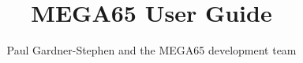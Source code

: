 \documentclass{book}
\begin{document}
%
\title{MEGA65 User Guide}

\author{Paul Gardner-Stephen and the MEGA65 development team}

\maketitle











\begin{appendices}
\end{appendices}





\end{document}
